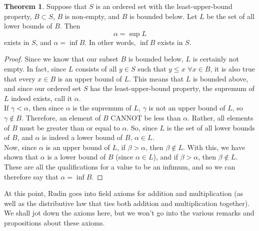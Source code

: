\documentclass{article}
\theoremstyle{definition}
\newtheorem{theorem}{Theorem}[section]
\begin{document}
\begin{section}
\begin{theorem}
Suppose that $S$ is an ordered set with the least-upper-bound property, $B \subset S$, $B$ is non-empty, and $B$ is bounded below. Let $L$ be the set of all lower bounds of $B$. Then \[ \alpha = \sup L\]exists in $S$, and $\alpha = \inf B$. In other words, $\inf B$ exists in $S$.
\end{theorem}

\begin{proof}
Since we know that our subset $B$ is bounded below, $L$ is certainly not empty. In fact, since $L$ consists of all $y \in S$ such that $y \leq x$ $\forall x \in B$, it is also true that every $x \in B$ is an upper bound of $L$. This means that $L$ is bounded above, and since our ordered set $S$ has the least-upper-bound property, the supremum of $L$ indeed exists, call it $\alpha$. \\
If $\gamma < \alpha$, then since $\alpha$ is the supremum of $L$, $\gamma$ is not an upper bound of $L$, so $\gamma \notin B$. Therefore, an element of $B$ CANNOT be less than $\alpha$. Rather, all elements of $B$ must be greater than or equal to $\alpha$. So, since $L$ is the set of all lower bounds of $B$, and $\alpha$ is indeed a lower bound of $B$, $\alpha \in L$. \\
Now, since $\alpha$ is an upper bound of $L$, if $\beta > \alpha$, then $\beta \notin L$. With this, we have shown that $\alpha$ is a lower bound of $B$ (since $\alpha \in L$), and if $\beta > \alpha$, then $\beta \notin L$. These are all the qualifications for a value to be an infimum, and so we can therefore say that $\alpha = \inf B$.
\end{proof}

\noindent At this point, Rudin goes into field axioms for addition and multiplication (as well as the distributive law that ties both addition and multiplication together). We shall jot down the axioms here, but we won't go into the various remarks and propositions about these axioms.


\end{section}
\end{document}
